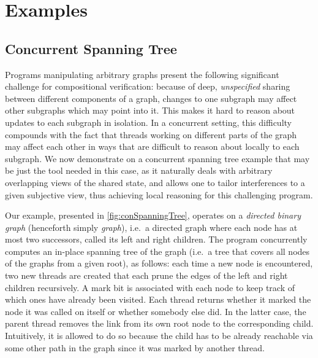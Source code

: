 \section{Examples}\label{sec:examples}


\subsection{Concurrent Spanning Tree}\label{subsec:CST-example}
Programs manipulating arbitrary graphs present the following
significant challenge for compositional verification: because of deep,
\emph{unspecified} sharing between different components of a graph,
changes to one subgraph may affect other subgraphs which may point
into it. This makes it hard to reason about updates to each subgraph
in isolation. In a concurrent setting, this difficulty compounds with
the fact that threads working on different parts of the graph may
affect each other in ways that are difficult to reason about locally
to each subgraph. We now demonstrate on a concurrent spanning tree
example that \colosl may be just the tool needed in this case, as it
naturally deals with arbitrary overlapping views of the shared state,
and allows one to tailor interferences to a given subjective view,
thus achieving local reasoning for this challenging program.

Our example, presented in \fig\ref{fig:conSpanningTree}, operates on a
\emph{directed binary graph} (henceforth simply \emph{graph}),
i.e.\ a directed graph where each node has at most two
successors, called its left and right children. The program concurrently computes an
in-place spanning tree of the graph (i.e.\ a tree that covers
all nodes of the graphs from a given root), as follows:
each time a new node is encountered, two new threads are created that
each prune the edges of the left and right children recursively. A
mark bit is associated with each node to keep track of which ones have
already been visited. Each thread returns whether it marked the node
it was called on itself or whether somebody else did. In the latter case,
the parent thread removes the link from its own root node to the
corresponding child. Intuitively, it is allowed to do so because the child has to be
already reachable via some other path in the graph since it was marked by another thread.


